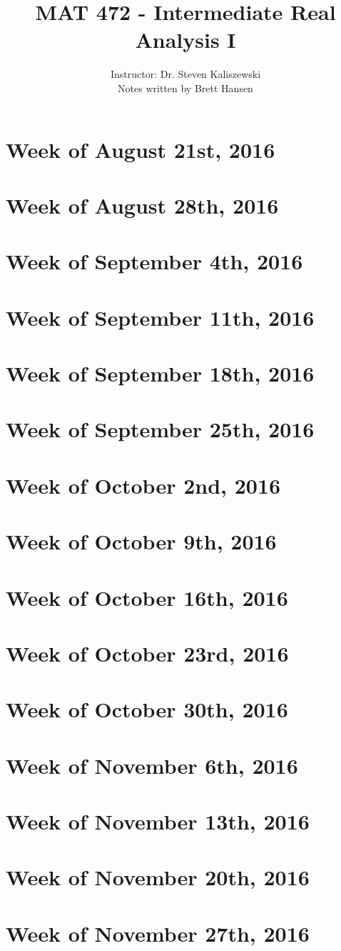 \documentclass{article}
\title{MAT 472 - Intermediate Real Analysis I}
\author{
{\Large Instructor: Dr. Steven Kaliszewski} \\
		Notes written by Brett Hansen
}
\date{}
\begin{document}
\maketitle
\tableofcontents
\break

\section{Week of August 21st, 2016}
\section{Week of August 28th, 2016}
\section{Week of September 4th, 2016}
\section{Week of September 11th, 2016}
\section{Week of September 18th, 2016}
\section{Week of September 25th, 2016}
\section{Week of October 2nd, 2016}
\section{Week of October 9th, 2016}
\section{Week of October 16th, 2016}
\section{Week of October 23rd, 2016}
\section{Week of October 30th, 2016}
\section{Week of November 6th, 2016}
\section{Week of November 13th, 2016}
\section{Week of November 20th, 2016}
\section{Week of November 27th, 2016}
\end{document}
